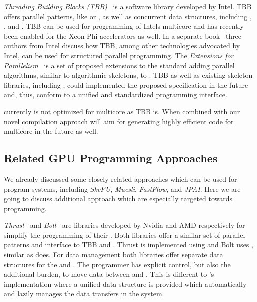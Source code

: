 \bigskip

\emph{Threading Building Blocks (TBB)}~\cite{Reinders2007} is a software library developed by Intel.
TBB offers parallel patterns, like  or , as well as concurrent data structures, including , , and .
TBB can be used for programming of Intels multicore \CPUs and has recently been enabled for the Xeon Phi accelerators as well.
In a separate book~\cite{McCoolRoRe2012} three authors from Intel discuss how TBB, among other technologies advocated by Intel, can be used for structured parallel programming.
The \emph{\Cpp Extensions for Parallelism}~\cite{CppParallelism} is a set of proposed extensions to the \Cpp standard adding parallel algorithms, similar to algorithmic skeletons, to \Cpp.
TBB as well as existing skeleton libraries, including \SkelCL, could implemented the proposed specification in the future and, thus, conform to a unified and standardized programming interface.

\SkelCL currently is not optimized for multicore \CPUs as TBB is.
When combined with our novel compilation approach \SkelCL will aim for generating highly efficient code for multicore \CPUs in the future as well.

\subsection{Related GPU Programming Approaches}
We already discussed some closely related approaches which can be used for program \GPU systems, including \emph{SkePU}, \emph{Muesli}, \emph{FastFlow}, and \emph{JPAI}.
Here we are going to discuss additional approach which are especially targeted towards \GPU programming.

\bigskip

\emph{Thrust}~\cite{BellHo2011} and \emph{Bolt}~\cite{Thrust} are \Cpp libraries developed by Nvidia and AMD respectively for simplify the programming of their \GPUs.
Both libraries offer a similar set of parallel patterns and interface to TBB and \SkelCL.
Thrust is implemented using \CUDA and Bolt uses \OpenCL, similar as \SkelCL does.
For data management both libraries offer separate data structures for the \CPU and \GPU.
The programmer has explicit control, but also the additional burden, to move data between \CPU and \GPU.
This is different to \SkelCL's implementation where a unified data structure is provided which automatically and lazily manages the data transfers in the system.

